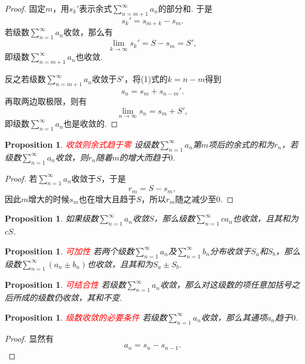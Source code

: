 \documentclass{article}
\newtheorem{proposition}[theorem]{Proposition}
\newcommand{\redt}[1]{\textcolor{red}{#1}}
\begin{document}
\begin{proof}
\rm 固定$m$，用$s_k'$表示余式$\sum\limits_{n=m+1}^\infty a_n$的部分和. 于是
\begin{equation}
s_k' = s_{m+k} - s_m.
\end{equation}
若级数$\sum\limits_{n=1}^\infty a_n$收敛，那么有
$$
\lim\limits_{k \to \infty}s_k' = S-s_m = S',
$$
即级数$\sum\limits_{n=m+1}^\infty a_n$也收敛. 

反之若级数$\sum\limits_{n=m+1}^\infty a_n$收敛于$S'$，将(1)式的$k=n-m$得到
$$
s_n = s_m + s_{n-m}'.
$$
再取两边取极限，则有
$$
\lim\limits_{n \to \infty} s_n  = s_m + S',
$$
即级数$\sum\limits_{n=1}^\infty a_n$也是收敛的. 
\end{proof}

\begin{proposition}
\rm \redt{收敛则余式趋于零} 设级数$\sum\limits_{n=1}^\infty a_n$第$m$项后的余式的和为$r_n$，若级数$\sum\limits_{n=1}^\infty a_n$收敛，则$r_n$随着$m$的增大而趋于$0$.
\end{proposition}

\begin{proof}
若$\sum\limits_{n=1}^\infty a_n$收敛于$S$，于是
$$
r_m = S - s_m,
$$
因此$m$增大的时候$s_m$也在增大且趋于$S$，所以$r_m$随之减少至$0$.
\end{proof}

\begin{proposition}
\rm 如果级数$\sum\limits_{n=1}^\infty a_n$收敛$S$，那么级数$\sum\limits_{n=1}^\infty ca_n$也收敛，且其和为$cS$. 
\end{proposition}


\begin{proposition}
\rm \redt{可加性} 若两个级数$\sum\limits_{n=1}^\infty a_n$及$\sum\limits_{n=1}^\infty b_n$分布收敛于$S_a$和$S_b$，那么级数$\sum\limits_{n=1}^\infty (a_n \pm b_n)$也收敛，且其和为$S_a \pm S_b$.
\end{proposition}

\begin{proposition}
\rm \redt{可结合性} 若级数$\sum\limits_{n=1}^\infty a_n$收敛，那么对这级数的项任意加括号之后所成的级数仍收敛，其和不变.
\end{proposition}

\begin{proposition}
\rm \redt{级数收敛的必要条件} 若级数$\sum\limits_{n=1}^\infty a_n$收敛，那么其通项$a_n$趋于$0$. 
\end{proposition}

\begin{proof}
显然有
$$
a_n = s_n - s_{n-1}.
$$
\end{proof}
\end{document}
